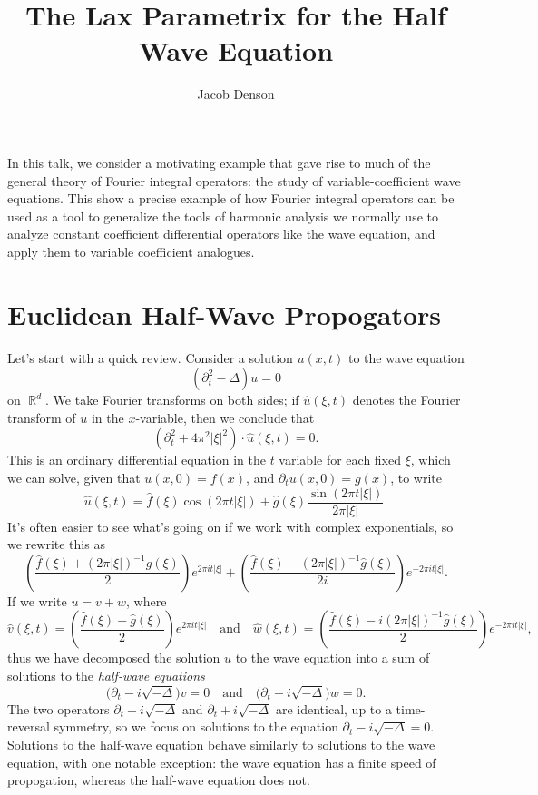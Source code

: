 \documentclass{article}
\title{The Lax Parametrix for the Half Wave Equation}
\author{Jacob Denson}
\theoremstyle{plain}
\theoremstyle{remark}
\theoremstyle{definition}
\DeclareMathOperator{\RR}{\mathbb{R}}
\begin{document}
\maketitle

In this talk, we consider a motivating example that gave rise to much of the general theory of Fourier integral operators: the study of variable-coefficient wave equations. This show a precise example of how Fourier integral operators can be used as a tool to generalize the tools of harmonic analysis we normally use to analyze constant coefficient differential operators like the wave equation, and apply them to variable coefficient analogues.

\section{Euclidean Half-Wave Propogators}

Let's start with a quick review. Consider a solution $u(x,t)$ to the wave equation
%
\[ (\partial_t^2 - \Delta) u = 0 \]
%
on $\RR^d$. We take Fourier transforms on both sides; if $\widehat{u}(\xi,t)$ denotes the Fourier transform of $u$ in the $x$-variable, then we conclude that
%
\[ (\partial_t^2 + 4 \pi^2 |\xi|^2) \cdot \widehat{u}(\xi,t) = 0. \]
%
This is an ordinary differential equation in the $t$ variable for each fixed $\xi$, which we can solve, given that $u(x,0) = f(x)$, and $\partial_t u(x,0) = g(x)$, to write
%
\[ \widehat{u}(\xi,t) = \widehat{f}(\xi) \cos(2 \pi t |\xi|) + \widehat{g}(\xi) \frac{\sin(2 \pi t |\xi|)}{2 \pi |\xi|}. \]
%
It's often easier to see what's going on if we work with complex exponentials, so we rewrite this as
%
\[ \left( \frac{\widehat{f}(\xi) + (2 \pi |\xi|)^{-1} \widehat{g}(\xi)}{2} \right) e^{2 \pi i t |\xi|} + \left( \frac{\widehat{f}(\xi) - (2 \pi |\xi|)^{-1} \widehat{g}(\xi)}{2i} \right) e^{-2 \pi i t |\xi|}. \]
%
If we write $u = v + w$, where
%
\[ \widehat{v}(\xi,t) = \left( \frac{\widehat{f}(\xi) + \widehat{g}(\xi)}{2} \right) e^{2 \pi i t |\xi|} \quad\text{and}\quad \widehat{w}(\xi,t) = \left( \frac{\widehat{f}(\xi) - i (2 \pi |\xi|)^{-1} \widehat{g}(\xi)}{2} \right) e^{-2 \pi i t |\xi|}, \]
%
thus we have decomposed the solution $u$ to the wave equation into a sum of solutions to the \emph{half-wave equations}
%
\[ \Big( \partial_t - i \sqrt{-\Delta} \Big) v = 0 \quad\text{and}\quad \Big(\partial_t + i \sqrt{-\Delta} \Big) w = 0. \]
%
The two operators $\partial_t - i \sqrt{-\Delta}$ and $\partial_t + i \sqrt{-\Delta}$ are identical, up to a time-reversal symmetry, so we focus on solutions to the equation $\partial_t - i \sqrt{-\Delta} = 0$. Solutions to the half-wave equation behave similarly to solutions to the wave equation, with one notable exception: the wave equation has a finite speed of propogation, whereas the half-wave equation does not.
\end{document}
